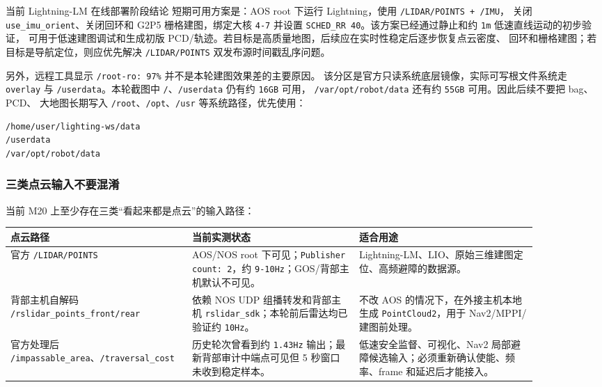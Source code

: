 \documentclass[UTF8,11pt,a4paper]{ctexart}
\begin{document}
\begin{orangebox}{当前 Lightning-LM 在线部署阶段结论}
短期可用方案是：AOS root 下运行 Lightning，使用 \texttt{/LIDAR/POINTS + /IMU}，
关闭 \texttt{use\_imu\_orient}、关闭回环和 G2P5 栅格建图，绑定大核 \texttt{4-7} 并设置
\texttt{SCHED\_RR 40}。该方案已经通过静止和约 \texttt{1m} 低速直线运动的初步验证，
可用于低速建图调试和生成初版 PCD/轨迹。若目标是高质量地图，后续应在实时性稳定后逐步恢复点云密度、
回环和栅格建图；若目标是导航定位，则应优先解决 \texttt{/LIDAR/POINTS} 双发布源时间戳乱序问题。
\end{orangebox}

另外，远程工具显示 \texttt{/root-ro: 97\%} 并不是本轮建图效果差的主要原因。
该分区是官方只读系统底层镜像，实际可写根文件系统走 \texttt{overlay} 与
\texttt{/userdata}。本轮截图中 \texttt{/}、\texttt{/userdata} 仍有约 \texttt{16GB} 可用，
\texttt{/var/opt/robot/data} 还有约 \texttt{55GB} 可用。因此后续不要把 bag、PCD、
大地图长期写入 \texttt{/root}、\texttt{/opt}、\texttt{/usr} 等系统路径，优先使用：

\begin{verbatim}
/home/user/lighting-ws/data
/userdata
/var/opt/robot/data
\end{verbatim}

\subsubsection{三类点云输入不要混淆}

当前 M20 上至少存在三类“看起来都是点云”的输入路径：

\begin{center}
\renewcommand{\arraystretch}{1.22}
\begin{tabular}{p{0.26\linewidth}p{0.30\linewidth}p{0.32\linewidth}}
\toprule
\textbf{点云路径} & \textbf{当前实测状态} & \textbf{适合用途}\\
\midrule
官方 \texttt{/LIDAR/POINTS} &
AOS/NOS root 下可见；\texttt{Publisher count: 2}，约 \texttt{9-10Hz}；GOS/背部主机默认不可见。 &
Lightning-LM、LIO、原始三维建图定位、高频避障的数据源。\\
背部主机自解码 \texttt{/rslidar\_points\_front/rear} &
依赖 NOS UDP 组播转发和背部主机 \texttt{rslidar\_sdk}；本轮前后雷达均已验证约 \texttt{10Hz}。 &
不改 AOS 的情况下，在外接主机本地生成 \texttt{PointCloud2}，用于 Nav2/MPPI/建图前处理。\\
官方处理后 \texttt{/impassable\_area}、\texttt{/traversal\_cost} &
历史轮次曾看到约 \texttt{1.43Hz} 输出；最新背部审计中端点可见但 5 秒窗口未收到稳定样本。 &
低速安全监督、可视化、Nav2 局部避障候选输入；必须重新确认使能、频率、frame 和延迟后才能接入。\\
\bottomrule
\end{tabular}
\end{center}
\end{document}
